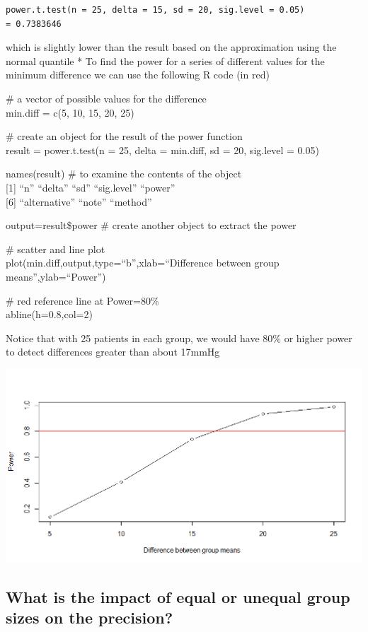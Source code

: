 \documentclass[
]{book}
\begin{document}
\begin{verbatim}
power.t.test(n = 25, delta = 15, sd = 20, sig.level = 0.05)
= 0.7383646
\end{verbatim}

which is slightly lower than the result based on the approximation using the normal quantile
* To find the power for a series of different values for the minimum difference we can use the following R code ({in red})

\(\#\) a vector of possible values for the difference\\
{min.diff = c(5, 10, 15, 20, 25)}

\(\#\) create an object for the result of the power function\\
{result = power.t.test(n = 25, delta = min.diff, sd = 20, sig.level = 0.05)}

{names(result)} \# to examine the contents of the object\\
{[}1{]} ``n'' ``delta'' ``sd'' ``sig.level'' ``power''\\
{[}6{]} ``alternative'' ``note'' ``method''

{output=result\$power} \# create another object to extract the power

\(\#\) scatter and line plot\\
{plot(min.diff,output,type=``b'',xlab=``Difference between group means'',ylab=``Power'')}

\(\#\) red reference line at Power=80\%\\
{abline(h=0.8,col=2)}

Notice that with 25 patients in each group, we would have 80\% or higher power to detect differences greater than about 17mmHg

\includegraphics[width=0.7\linewidth]{./4_73}

\hypertarget{what-is-the-impact-of-equal-or-unequal-group-sizes-on-the-precision}{%
\subsection{What is the impact of equal or unequal group sizes on the precision?}\label{what-is-the-impact-of-equal-or-unequal-group-sizes-on-the-precision}}
\end{document}
